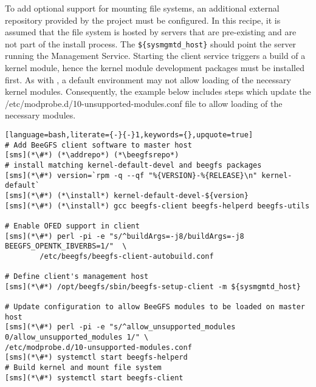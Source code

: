To add optional support for mounting \beegfs{} file systems, an
additional external \pkgmgr{} repository provided by the \beegfs{} project must be
configured.  In this recipe, it is
assumed that the file system is hosted by servers that are pre-existing
and are not part of the install process. The \texttt{\$\{sysmgmtd\_host\}} should
point the server running the \beegfs{} Management Service. Starting the client service triggers
a build of a kernel module, hence the kernel module development packages must be
installed first. As with \Lustre{}, a default \baseOS{} environment may not allow
loading of the necessary \beegfs{} kernel modules. Consequently, the example below
includes steps which update the /etc/modprobe.d/10-unsupported-modules.conf file
to allow loading of the necessary modules.

\begin{lstlisting}[language=bash,literate={-}{-}1,keywords={},upquote=true]
# Add BeeGFS client software to master host
[sms](*\#*) (*\addrepo*) (*\beegfsrepo*)
# install matching kernel-default-devel and beegfs packages
[sms](*\#*) version=`rpm -q --qf "%{VERSION}-%{RELEASE}\n" kernel-default`
[sms](*\#*) (*\install*) kernel-default-devel-${version}
[sms](*\#*) (*\install*) gcc beegfs-client beegfs-helperd beegfs-utils

# Enable OFED support in client
[sms](*\#*) perl -pi -e "s/^buildArgs=-j8/buildArgs=-j8 BEEGFS_OPENTK_IBVERBS=1/"  \
        /etc/beegfs/beegfs-client-autobuild.conf

# Define client's management host
[sms](*\#*) /opt/beegfs/sbin/beegfs-setup-client -m ${sysmgmtd_host}

# Update configuration to allow BeeGFS modules to be loaded on master host
[sms](*\#*) perl -pi -e "s/^allow_unsupported_modules 0/allow_unsupported_modules 1/" \
/etc/modprobe.d/10-unsupported-modules.conf
[sms](*\#*) systemctl start beegfs-helperd
# Build kernel and mount file system
[sms](*\#*) systemctl start beegfs-client
\end{lstlisting}

